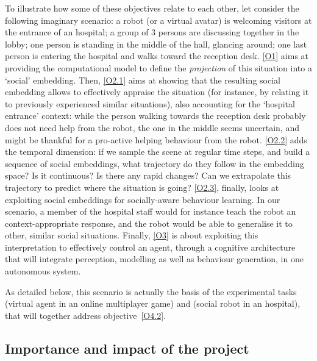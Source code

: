 To illustrate how some of these objectives relate to each other, let consider
the following imaginary scenario: a robot (or a virtual avatar) is welcoming
visitors at the entrance of an hospital; a group of 3 persons are discussing
together in the lobby; one person is standing in the middle of the hall,
glancing around; one last person is entering the hospital and walks toward the
reception desk.  \ref{O1} aims at providing the computational model to define
the \emph{projection} of this situation into a `social' embedding. Then,
\ref{O2.1} aims at showing that the resulting social embedding allows to
effectively appraise the situation (for instance, by relating it to previously
experienced similar situations), also accounting for the `hospital entrance'
context: while the person walking towards the reception desk probably does not
need help from the robot, the one in the middle seems uncertain, and might be
thankful for a pro-active helping behaviour from the robot. \ref{O2.2} adds the
temporal dimension: if we sample the scene at regular time steps, and build a
sequence of social embeddings, what trajectory do they follow in the embedding
space? Is it continuous? Is there any rapid changes? Can we extrapolate this
trajectory to predict where the situation is going? \ref{O2.3}, finally, looks
at exploiting social embeddings for socially-aware behaviour learning. In our
scenario, a member of the hospital staff would for instance teach the robot an
context-appropriate response, and the robot would be able to generalise it to
other, similar social situations.  Finally, \ref{O3} is about exploiting this
interpretation to effectively control an agent, through a cognitive architecture
that will integrate perception, modelling as well as behaviour generation, in
one autonomous system.

As detailed below, this scenario is actually the basis of the experimental tasks
\tDC (virtual agent in an online multiplayer game) and \tDD (social robot in an
hospital), that will together address objective~\ref{O4.2}.

\subsection{Importance and impact of the project}

